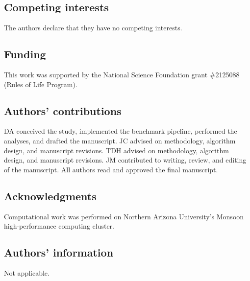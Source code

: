 \documentclass[11pt]{article}
\begin{document}
\subsection*{Competing interests}
The authors declare that they have no competing interests.

\subsection*{Funding}
This work was supported by the National Science Foundation grant \#2125088 (Rules of Life Program).

\subsection*{Authors' contributions}
DA conceived the study, implemented the benchmark pipeline, performed the analyses, and drafted the manuscript.
JC advised on methodology, algorithm design, and manuscript revisions.
TDH advised on methodology, algorithm design, and manuscript revisions.
JM contributed to writing, review, and editing of the manuscript.
All authors read and approved the final manuscript.

\subsection*{Acknowledgments}
Computational work was performed on Northern Arizona University's Monsoon high-performance computing cluster.

\subsection*{Authors' information}
Not applicable.
\end{document}
